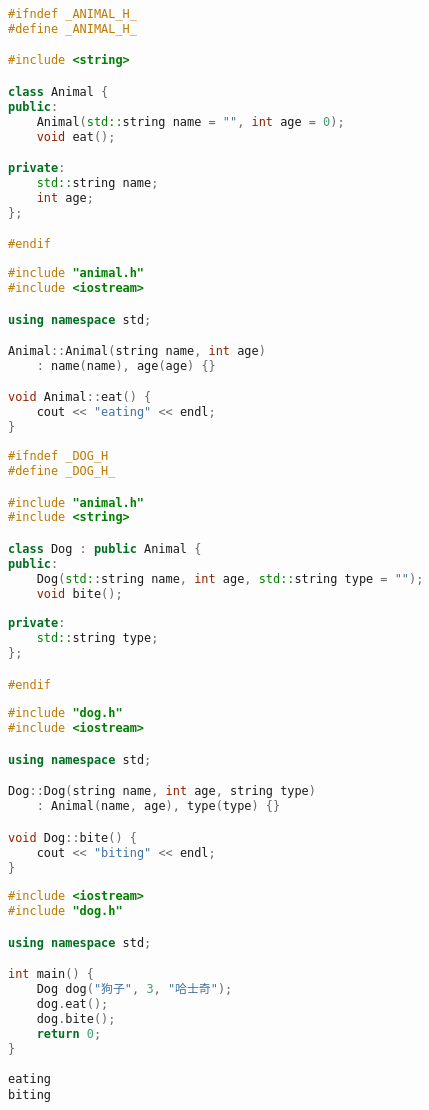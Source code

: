 
\begin{lstlisting}[language=C++, title=animal.h]
#ifndef _ANIMAL_H_
#define _ANIMAL_H_

#include <string>

class Animal {
public:
    Animal(std::string name = "", int age = 0);
    void eat();

private:
    std::string name;
    int age;
};

#endif
\end{lstlisting}

\begin{lstlisting}[language=C++, title=animal.cpp]
#include "animal.h"
#include <iostream>

using namespace std;

Animal::Animal(string name, int age)
    : name(name), age(age) {}

void Animal::eat() {
    cout << "eating" << endl;
}
\end{lstlisting}

\begin{lstlisting}[language=C++, title=dog.h]
#ifndef _DOG_H
#define _DOG_H_

#include "animal.h"
#include <string>

class Dog : public Animal {
public:
    Dog(std::string name, int age, std::string type = "");
    void bite();
    
private:
    std::string type;
};

#endif
\end{lstlisting}

\begin{lstlisting}[language=C++, title=dog.cpp]
#include "dog.h"
#include <iostream>

using namespace std;

Dog::Dog(string name, int age, string type)
    : Animal(name, age), type(type) {}

void Dog::bite() {
    cout << "biting" << endl;
}
\end{lstlisting}

\begin{lstlisting}[language=C++, title=test\_dog.cpp]
#include <iostream>
#include "dog.h"

using namespace std;

int main() {
    Dog dog("狗子", 3, "哈士奇");
    dog.eat();
    dog.bite();
    return 0;
}
\end{lstlisting}

\begin{tcolorbox}
	\begin{verbatim}
eating
biting
	\end{verbatim}
\end{tcolorbox}

